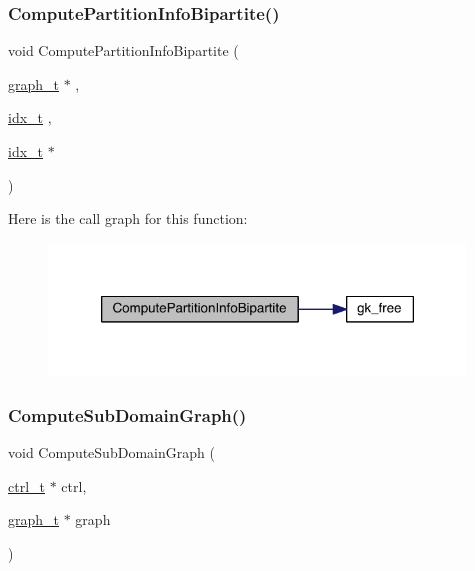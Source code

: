 \subsubsection{\texorpdfstring{Compute\+Partition\+Info\+Bipartite()}{ComputePartitionInfoBipartite()}}
{\footnotesize\ttfamily void Compute\+Partition\+Info\+Bipartite (\begin{DoxyParamCaption}\item[{\hyperlink{a00734}{graph\+\_\+t} $\ast$}]{,  }\item[{\hyperlink{a00876_aaa5262be3e700770163401acb0150f52}{idx\+\_\+t}}]{,  }\item[{\hyperlink{a00876_aaa5262be3e700770163401acb0150f52}{idx\+\_\+t} $\ast$}]{ }\end{DoxyParamCaption})}

Here is the call graph for this function\+:\nopagebreak
\begin{figure}[H]
\begin{center}
\leavevmode
\includegraphics[width=314pt]{a00945_a9d1af3e91b56dfaa4e4f7d4b743b187d_cgraph}
\end{center}
\end{figure}
\mbox{\label{a00945_a78c50bcdffefbd90914a77c4add573cc}} 
\subsubsection{\texorpdfstring{Compute\+Sub\+Domain\+Graph()}{ComputeSubDomainGraph()}}
{\footnotesize\ttfamily void Compute\+Sub\+Domain\+Graph (\begin{DoxyParamCaption}\item[{\hyperlink{a00742}{ctrl\+\_\+t} $\ast$}]{ctrl,  }\item[{\hyperlink{a00734}{graph\+\_\+t} $\ast$}]{graph }\end{DoxyParamCaption})}

